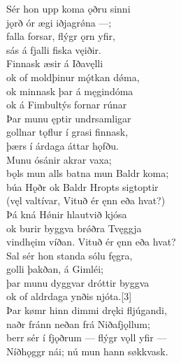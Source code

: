 \bva Sér hon upp koma \hld ǫðru sinni \\%
jǫrð ór ægi \hld iðjagrǿna —; \\%
falla forsar, \hld flýgr ǫrn yfir, \\%
sás á fjalli \hld fiska vęiðir.\\%

\bva Finnask æsir \hld á Iðavęlli \\%
ok of moldþinur \hld mǫ́tkan dǿma, \\%
ok minnask þar \hld á męgindóma \\%
ok á Fimbultýs \hld fornar rúnar\\%

\bva Þar munu ęptir \hld undrsamligar \\%
gollnar tǫflur \hld í grasi finnask, \\%
þærs í árdaga \hld áttar hǫfðu.\\%

\bva Munu ósánir \hld akrar vaxa; \\%
bǫls mun alls batna \hld mun Baldr koma; \\%
búa Hǫðr ok Baldr \hld Hropts sigtoptir \\%
(vęl valtívar, \hld Vituð ér ęnn eða hvat?)\\%

\bva Þá kná Hǿnir \hld hlautvið kjósa \\%
ok burir byggva \hld brǿðra Tvęggja \\%
vindhęim víðan. \hld Vituð ér ęnn eða hvat?\\%

\bva Sal sér hon standa \hld sólu fęgra, \\%
golli þakðan, \hld á Gimléi; \\%
þar munu dyggvar \hld dróttir byggva \\%
ok of aldrdaga \hld ynðis njóta.[3]\\%

\bva Þar kømr hinn dimmi \hld dręki fljúgandi, \\%
naðr fránn neðan \hld frá Niðafjǫllum; \\%
berr sér í fjǫðrum \hld — flýgr vǫll yfir — \\%
Níðhǫggr nái; \hld nú mun hann søkkvask.
